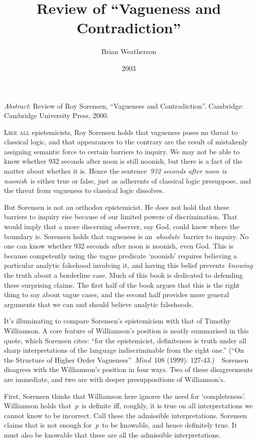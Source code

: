 \documentclass[
  11pt,
  letterpaper,
  DIV=11,
  numbers=noendperiod,
  twoside]{scrartcl}
\title{Review of ``Vagueness and Contradiction''}
\author{Brian Weatherson}
\date{2003}
\renewenvironment{abstract}
 {\vspace{-1.25cm}
 \quotation\small\noindent\emph{Abstract}:}
 {\endquotation}
\renewenvironment{abstract}
 {\quotation\small\noindent\emph{Abstract}:}
 {\endquotation\vspace{-0.02cm}}
\begin{document}
\maketitle
\begin{abstract}
Review of Roy Sorensen, ``Vagueness and Contradiction''. Cambridge:
Cambridge University Press, 2000.
\end{abstract}


\lettrine{L}{ike all} epistemicists, Roy Sorensen holds that vagueness
poses no threat to classical logic, and that appearances to the contrary
are the result of mistakenly assigning semantic force to certain
barriers to inquiry. We may not be able to know whether 932 seconds
after noon is still noonish, but there is a fact of the matter about
whether it is. Hence the sentence~\emph{932 seconds after noon is
noonish}~is either true or false, just as adherents of classical logic
presuppose, and the threat from vagueness to classical logic dissolves.

But Sorensen is not an orthodox epistemicist. He does not hold that
these barriers to inquiry rise because of our limited powers of
discrimination. That would imply that a more discerning observer, say
God, could know where the boundary is. Sorensen holds that vagueness is
an~\emph{absolute}~barrier to inquiry. No one can know whether 932
seconds after noon is noonish, even God. This is because competently
using the vague predicate `noonish' requires believing a particular
analytic falsehood involving it, and having this belief
prevents~\emph{knowing} the truth about a borderline case. Much of this
book is dedicated to defending these surprising claims. The first half
of the book argues that this is the right thing to say about vague
cases, and the second half provides more general arguments that we can
and should believe analytic falsehoods.

It's illuminating to compare Sorensen's epistemicism with that of
Timothy Williamson. A core feature of Williamson's position is neatly
summarised in this quote, which Sorensen cites: ``for the epistemicist,
definiteness is truth under all sharp interpretations of the language
indiscriminable from the right one.'' (``On the Structure of Higher
Order Vagueness''~\emph{Mind}~108 (1999): 127‑43.)~~Sorensen disagrees
with the Williamson's position in four ways. Two of these disagreements
are immediate, and two are with deeper presuppositions of Williamson's.

First, Sorensen thinks that Williamson here ignores the need for
`completeness'. Williamson holds that~\emph{p}~is definite iff, roughly,
it is true on all interpretations we cannot know to be incorrect. Call
these the admissible interpretations. Sorensen claims that is not enough
for~\emph{p}~to be knowable, and hence definitely true. It must also be
knowable that these are all the admissible interpretations.
\end{document}
